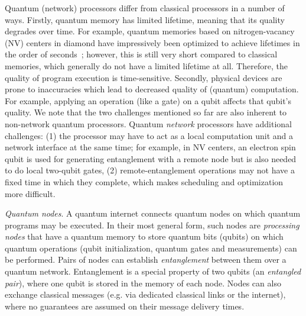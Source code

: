Quantum (network) processors differ from classical processors in a number of ways.
Firstly, quantum memory has limited lifetime, meaning that its quality degrades over time.
For example, quantum memories based on nitrogen-vacancy (NV) centers in diamond have impressively been optimized to achieve lifetimes in the order of seconds~\cite{Abobeih2018};
however, this is still very short compared to classical memories, which generally do not have a limited lifetime at all.
Therefore, the quality of program execution is time-sensitive.
Secondly, physical devices are prone to inaccuracies which lead to decreased quality of (quantum) computation.
For example, applying an operation (like a gate) on a qubit affects that qubit's quality.
We note that the two challenges mentioned so far are also inherent to non-network quantum processors.
Quantum \textit{network} processors have additional challenges:
    (1) the processor may have to act as a local computation unit and a network interface at the same time;
    for example, in NV centers, an electron spin qubit is used for generating entanglement with a remote node but is also needed to do local two-qubit gates,
    (2) remote-entanglement operations may not have a fixed time in which they complete, which makes scheduling and optimization more difficult.

\textit{Quantum nodes}.
A quantum internet connects quantum nodes on which quantum programs may be 
executed.
In their most general form, such nodes
are \textit{processing nodes} that have a quantum memory to store quantum bits (qubits) on which quantum operations (qubit initialization, quantum gates and measurements) can be performed. Pairs of nodes can establish \textit{entanglement} between them over a quantum network. Entanglement is a special property of two qubits (an \emph{entangled pair}), where one qubit is stored in the memory of each node. Nodes can also exchange classical messages (e.g. via dedicated classical links or the internet), where no guarantees are assumed on their message delivery times. 

